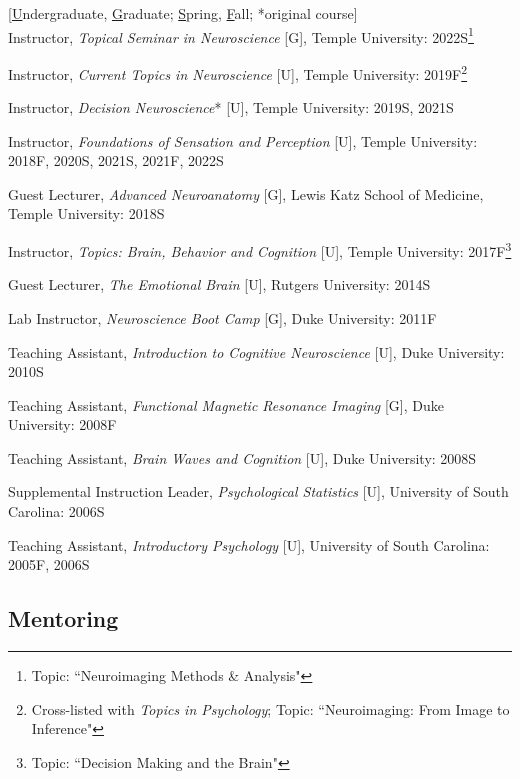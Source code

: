 \documentclass[11pt, letterpaper]{article}
\begin{document}
\begin{hangparas}{.5in}{1}

[\underline{U}ndergraduate, \underline{G}raduate; \underline{S}pring, \underline{F}all; *original course]  \\

Instructor, \textit{Topical Seminar in Neuroscience} [G], Temple University: 2022S\footnote{Topic: ``Neuroimaging Methods \& Analysis"}

Instructor, \textit{Current Topics in Neuroscience} [U], Temple University: 2019F\footnote{Cross-listed with \textit{Topics in Psychology}; Topic: ``Neuroimaging: From Image to Inference"}

Instructor, \textit{Decision Neuroscience}* [U], Temple University: 2019S, 2021S

Instructor, \textit{Foundations of Sensation and Perception} [U], Temple University: 2018F, 2020S, 2021S, 2021F, 2022S

Guest Lecturer, \textit{Advanced Neuroanatomy} [G], Lewis Katz School of Medicine, Temple University: 2018S

Instructor, \textit{Topics: Brain, Behavior and Cognition} [U], Temple University: 2017F\footnote{Topic: ``Decision Making and the Brain"}

Guest Lecturer, \textit{The Emotional Brain} [U], Rutgers University: 2014S

Lab Instructor, \textit{Neuroscience Boot Camp} [G], Duke University: 2011F

Teaching Assistant, \textit{Introduction to Cognitive Neuroscience} [U], Duke University: 2010S

Teaching Assistant, \textit{Functional Magnetic Resonance Imaging} [G], Duke University: 2008F

Teaching Assistant, \textit{Brain Waves and Cognition} [U], Duke University: 2008S

Supplemental Instruction Leader, \textit{Psychological Statistics} [U], University of South Carolina: 2006S

Teaching Assistant, \textit{Introductory Psychology} [U], University of South Carolina: 2005F, 2006S \\

\end{hangparas}


\subsection*{Mentoring}
\end{document}

